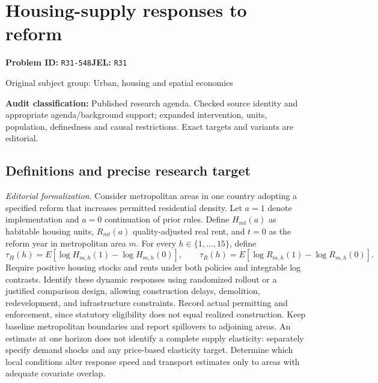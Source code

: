 \documentclass[11pt,a4paper]{article}
\begin{document}
\section*{Housing-supply responses to reform}
\textbf{Problem ID:} \texttt{R31-548}\quad \textbf{JEL:} \texttt{R31}\par
\label{problem:OP-0460}
{\sffamily\small\color{muted}Original subject group: Urban, housing and spatial economics\par}
\label{definitions:problem:30007742}
\textbf{Audit classification:} Published research agenda. Checked source identity and appropriate agenda/background support; expanded intervention, units, population, definedness and causal restrictions. Exact targets and variants are editorial.
\subsection*{Definitions and precise research target}
\textit{Editorial formalization.} Consider metropolitan areas in one country adopting a specified reform that increases permitted residential density. Let \(a=1\) denote implementation and \(a=0\) continuation of prior rules. Define \(H_{mt}(a)\) as habitable housing units, \(R_{mt}(a)\) quality-adjusted real rent, and \(t=0\) as the reform year in metropolitan area \(m\). For every \(h\in\{1,\ldots,15\}\), define
\[\tau_H(h)=E[\log H_{m,h}(1)-\log H_{m,h}(0)],\qquad\tau_R(h)=E[\log R_{m,h}(1)-\log R_{m,h}(0)].\]
Require positive housing stocks and rents under both policies and integrable log contrasts. Identify these dynamic responses using randomized rollout or a justified comparison design, allowing construction delays, demolition, redevelopment, and infrastructure constraints. Record actual permitting and enforcement, since statutory eligibility does not equal realized construction. Keep baseline metropolitan boundaries and report spillovers to adjoining areas. An estimate at one horizon does not identify a complete supply elasticity: separately specify demand shocks and any price-based elasticity target. Determine which local conditions alter response speed and transport estimates only to areas with adequate covariate overlap.
\end{document}
